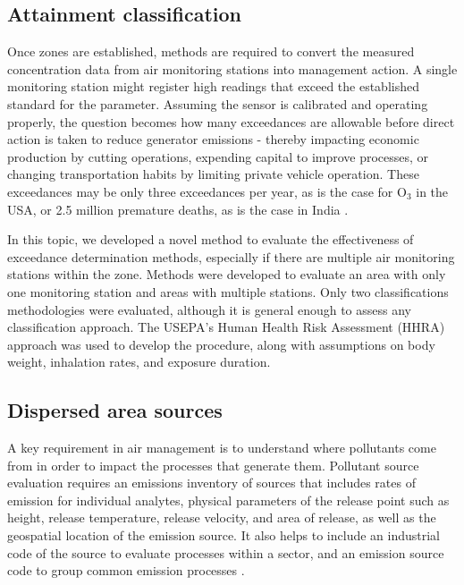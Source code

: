\subsection{Attainment classification}

Once zones are established, methods are required to convert the measured concentration data from air monitoring stations into management action. A single monitoring station might register high readings that exceed the established standard for the parameter. Assuming the sensor is calibrated and operating properly, the question becomes how many exceedances are allowable before direct action is taken to reduce generator emissions - thereby impacting economic production by cutting operations, expending capital to improve processes, or changing transportation habits by limiting private vehicle operation. These exceedances may be only three exceedances per year, as is the case for O$_{3}$ in the USA, or 2.5 million premature deaths, as is the case in India \citep{Landrigan2017}.

In this topic, we developed a novel method to evaluate the effectiveness of exceedance determination methods, especially if there are multiple air monitoring stations within the zone. Methods were developed to evaluate an area with only one monitoring station and areas with multiple stations. Only two classifications methodologies were evaluated, although it is general enough to assess any classification approach. The USEPA's Human Health Risk Assessment (HHRA) approach was used to develop the procedure, along with assumptions on body weight, inhalation rates, and exposure duration. 

\subsection{Dispersed area sources}

A key requirement in air management is to understand where pollutants come from in order to impact the processes that generate them. Pollutant source evaluation requires an emissions inventory of sources that includes rates of emission for individual analytes, physical parameters of the release point such as height, release temperature, release velocity, and area of release, as well as the geospatial location of the emission source. It also helps to include an industrial code of the source to evaluate processes within a sector, and an emission source code to group common emission processes \citep{The2008}.

